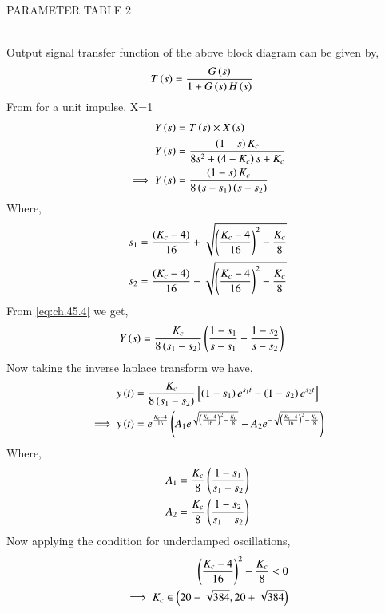 \documentclass[journal,12pt,twocolumn]{IEEEtran}
\theoremstyle{remark}
\begin{document}
\begin{table}[ht]
    \centering
    
    \caption{PARAMETER TABLE 2}
    \label{tab:ch.45.2}
\end{table} \\
Output signal transfer function of the above block diagram can be given by,
\begin{align}
     T\left(s\right) &= \frac{G\left(s\right)}{1+G\left(s\right)H\left(s\right)}    
\end{align}
From 
for a unit impulse, X=1 \\
\begin{align}
    Y\left(s\right) &= T\left(s\right)\times X\left(s\right)   \\
    Y\left(s\right) &= \frac{\left(1-s\right)K_c}{8s^2 + \left(4-K_c\right)s + K_c}  \\
    \implies Y\left(s\right) &= \frac{\left(1-s\right)K_c}{8\left(s-s_1\right)\left(s-s_2\right)}  \label{eq:ch.45.4}
\end{align}
Where,
\begin{align}
    s_1 &= \frac{\left(K_c-4\right)}{16} + \sqrt{\left(\frac{K_c-4}{16}\right)^2 - \frac{K_c}{8}}  \\
    s_2 &= \frac{\left(K_c-4\right)}{16} - \sqrt{\left(\frac{K_c-4}{16}\right)^2 - \frac{K_c}{8}} 
\end{align}
From \eqref{eq:ch.45.4} we get,
\begin{align}
    Y\left(s\right) &= \frac{K_c}{8\left(s_1-s_2\right)}\left(\frac{1-s_1}{s-s_1}-\frac{1-s_2}{s-s_2}\right)
\end{align}
Now taking the inverse laplace transform we have,
\begin{align}
    y\left(t\right) &= \frac{K_c}{8\left(s_1-s_2\right)} \left [\left(1-s_1\right)e^{s_1t}-\left(1-s_2\right)e^{s_2t} \right ]  \\
    \implies y\left(t\right) &= e^{\frac{K_c-4}{16}}\left(A_1e^{\sqrt{\left(\frac{K_c-4}{16}\right)^2 - \frac{K_c}{8}}} - A_2e^{-\sqrt{\left(\frac{K_c-4}{16}\right)^2 - \frac{K_c}{8}}}\right)    
\end{align}
Where,
\begin{align}
    A_1 &= \frac{K_c}{8} \left(\frac{1-s_1}{s_1-s_2}\right)    \\
    A_2 &= \frac{K_c}{8} \left(\frac{1-s_2}{s_1-s_2}\right)    
\end{align}
Now applying the condition for underdamped oscillations,
\begin{align}
    \left(\frac{K_c-4}{16}\right)^2 - \frac{K_c}{8} < 0    \\
    \implies K_c \in \left(20-\sqrt{384} , 20+\sqrt{384}\right)   \label{eq:ch.45.13}
\end{align}
\end{document}
